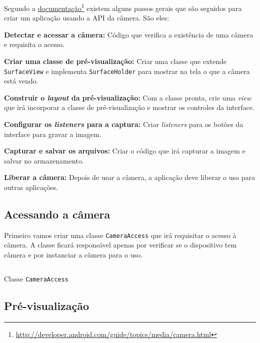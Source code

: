 \documentclass[a4paper,12pt,brazil]{book}
\begin{document}
\begin{singlespace}
		Segundo a \href{http://developer.android.com/guide/topics/media/camera.html}{documentação}\footnote{\href{http://developer.android.com/guide/topics/media/camera.html}{http://developer.android.com/guide/topics/media/camera.html}} existem alguns passos gerais que são seguidos para criar um aplicação usando a API da câmera. São eles:
		\bi
			\item \textbf{Detectar e acessar a câmera:} Código que verifica a existência de uma câmera e requisita o acesso.
			\item \textbf{Criar uma classe de pré-visualização:} Criar uma classe que extende \texttt{SurfaceView} e implementa \texttt{SurfaceHolder} para mostrar na tela o que a câmera está vendo.
			\item \textbf{Construir o \emph{layout} da pré-visualização:} Com a classe pronta, crie uma \emph{view} que irá incorporar a classe de pré-visualização e mostrar os controles da interface.
			\item \textbf{Configurar os \emph{listeners} para a captura:} Criar \emph{listeners} para os botões da interface para gravar a imagem.
			\item \textbf{Capturar e salvar os arquivos:} Criar o código que irá capturar a imagem e salvar no armazenamento.
			\item \textbf{Liberar a câmera:} Depois de usar a câmera, a aplicação deve liberar o uso para outras aplicações. 
		\ei

		\subsection{Acessando a câmera}

		Primeiro vamos criar uma classe \texttt{CameraAccess} que irá requisitar o acesso à câmera. 
		A classe ficará responsável apenas por verificar se o dispositivo tem câmera e por instanciar a câmera para o uso. 

		\begin{listing}[H]
		\inputminted[linenos=true,fontsize=\small,frame=lines, framesep=2mm, tabsize=2,numbersep=5pt]{java}{src/api/camera/camera-access.java}
		\caption{Classe \texttt{CameraAccess}}
		\label{code:camera-access}
		\end{listing} 	

		\subsection{Pré-visualização}


\end{singlespace}
\end{document}
